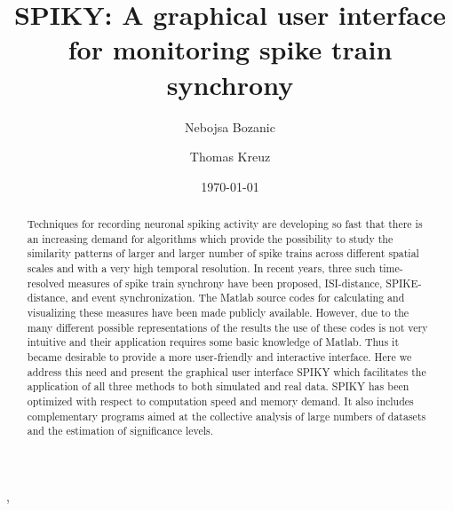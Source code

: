 \documentclass[10pt,twocolumn]{elsart5p}
\begin{document}
\begin{frontmatter}

\title{SPIKY: A graphical user interface for monitoring spike train synchrony}

\author{Nebojsa Bozanic},
\author{Thomas Kreuz}


\address{Institute for complex systems, CNR, Sesto Fiorentino, Italy}


\date{\today}

\begin{abstract}

Techniques for recording neuronal spiking activity are developing so fast that there is an increasing demand for algorithms which provide the possibility to study the similarity patterns of larger and larger number of spike trains across different spatial scales and with a very high temporal resolution. In recent years, three such time-resolved measures of spike train synchrony have been proposed, ISI-distance, SPIKE-distance, and event synchronization. The Matlab source codes for calculating and visualizing these measures have been made publicly available. However, due to the many different possible representations of the results the use of these codes is not very intuitive and their application requires some basic knowledge of Matlab. Thus it became desirable to provide a more user-friendly and interactive interface. Here we address this need and present the graphical user interface SPIKY which facilitates the application of all three methods to both simulated and real data. SPIKY has been optimized with respect to computation speed and memory demand. It also includes complementary programs aimed at the collective analysis of large numbers of datasets and the estimation of significance levels.

\end{abstract}



\end{frontmatter}

\newcommand{\abb}{\small\sf}

%
%
\end{document}
